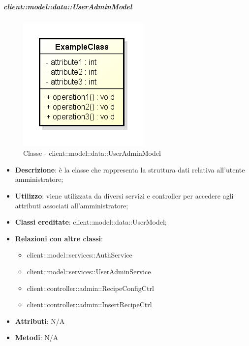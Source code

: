 		\subparagraph{client::model::data::UserAdminModel} %
		\label{subp:client_model_data_useradminmodel}
			\begin{figure}[htbp]
				\centering
				\centerline{\includegraphics[scale=0.7]{./images/client/classes/example_class.png}}
				\caption{Classe - client::model::data::UserAdminModel}
			\end{figure}
			\begin{itemize}
				\item \textbf{Descrizione}: è la classe che rappresenta la struttura dati relativa all'utente amministratore;
				\item \textbf{Utilizzo}: viene utilizzata da diversi servizi e controller per accedere agli attributi associati all'amministratore;
				\item \textbf{Classi ereditate}: client::model::data::UserModel;
				\item \textbf{Relazioni con altre classi}:
					\begin{itemize}
						\item client::model::services::AuthService
						\item client::model::services::UserAdminService
						\item client::controller::admin::RecipeConfigCtrl
						\item client::controller::admin::InsertRecipeCtrl
					\end{itemize}
				\item \textbf{Attributi}: N/A
				\item \textbf{Metodi}: N/A
			\end{itemize}

